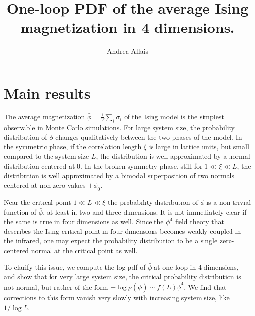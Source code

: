 \documentclass[11pt,a4paper]{article}
\title{One-loop PDF of the average Ising magnetization in 4 dimensions.}
\author[a]{Andrea Allais}
\affiliation[a]{Independent scholar}
\begin{document}
\maketitle

\section{Main results}

The average magnetization $\bar{\phi} = \frac{1}{V} \sum_{i} \sigma_i$ of the
Ising model is the simplest observable in Monte Carlo simulations. For large
system size, the probability distribution of $\bar{\phi}$ changes qualitatively
between the two phases of the model. In the symmetric phase, if the correlation
length $\xi$ is large in lattice units, but small compared to the system size
$L$, the distribution is well approximated by a normal distribution centered at
0. In the broken symmetry phase, still for $1 \ll \xi \ll L$, the distribution
is well approximated by a bimodal superposition of two normals centered at
non-zero values $\pm \bar{\phi}_0$. 

Near the critical point $1 \ll L \ll \xi$ the probability distribution of
$\bar{\phi}$ is a non-trivial function of $\bar{\phi}$, at least in two and
three dimensions.  It is not immediately clear if the same is true in four
dimensions as well.  Since the $\phi^4$ field theory that describes the Ising
critical point in four dimensions becomes weakly coupled in the infrared, one
may expect the probability distribution to be a single zero-centered normal at
the critical point as well.

To clarify this issue, we compute the log pdf of $\bar{\phi}$ at one-loop in
$4$ dimensions, and show that for very large system size, the critical
probability distribution is not normal, but rather of the form
$-\log p(\bar{\phi})\sim f(L) \bar{\phi}^4$. We find that corrections to this
form vanish very slowly with increasing system size, like $1/\log L$.
\end{document}

